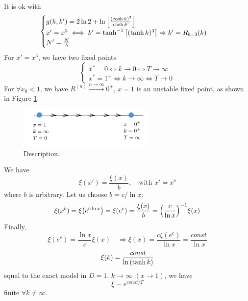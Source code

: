 \documentclass[../main/main.tex]{subfiles}
\begin{document}
It is ok with
\begin{equation}
  \begin{cases}
   g(k,k') = 2 \ln{2} +  \ln{ \qty[ \frac{(\cosh k)^3}{\cosh k'}] } \\
   x' = x^3  \iff k'= \tanh^{-1} \qty[ (\tanh k)^3] \Rightarrow k' = R_{b=3} (k)\\
   N' = \frac{N}{b}
  \end{cases}
\end{equation}
For \( x' = x^3 \), we have two fixed points
\begin{equation}
  \begin{cases}
   x^* = 0 \iff k \rightarrow 0 \iff T \rightarrow \infty \\
   x^* = 1^- \iff k \rightarrow \infty  \iff T \rightarrow 0
  \end{cases}
\end{equation}
For \( \forall x_0 < 1 \), we have \( R^{(n)} \overset{n \rightarrow \infty }{\longrightarrow} 0^+ \), \( x=1 \) is an unstable fixed point, as shown in Figure  \ref{fig:20_3}.
\begin{figure}[h!]
\centering
\includegraphics[width=0.6\textwidth]{../lessons/20_image/3.pdf}
\caption{\label{fig:20_3} Description.}
\end{figure}
We have
\begin{equation}
  \xi (x') = \frac{\xi (x)}{b}, \quad \text{with } x' = x^b
\end{equation}
where \( b \) is arbitrary. Let us choose \( b = c / \ln{x}  \):
\begin{equation}
  \xi (x^b) = \xi  \qty(e ^{b \ln{x} }) = \xi (e^c) = \frac{\xi (x)}{b}
  = \qty(\frac{c}{\ln{x} })^{-1} \xi (x)
\end{equation}
Finally,
\begin{equation}
  \xi (e^c) = \frac{\ln{x} }{c} \xi (x) \quad \Rightarrow \xi (x) = \frac{c \xi (e^c)}{\ln{x} } = \frac{const}{\ln{x} }
\end{equation}
\begin{equation}
  \xi (k) = \frac{const}{\ln{\qty(\tanh k) } }
\end{equation}
equal to the exact model in \( D=1 \).
\( k \rightarrow \infty  \) \( (x \rightarrow 1) \), we have
\begin{equation}
  \xi \sim e^{const/T}
\end{equation}
finite \( \forall k \neq \infty  \).
\end{document}
